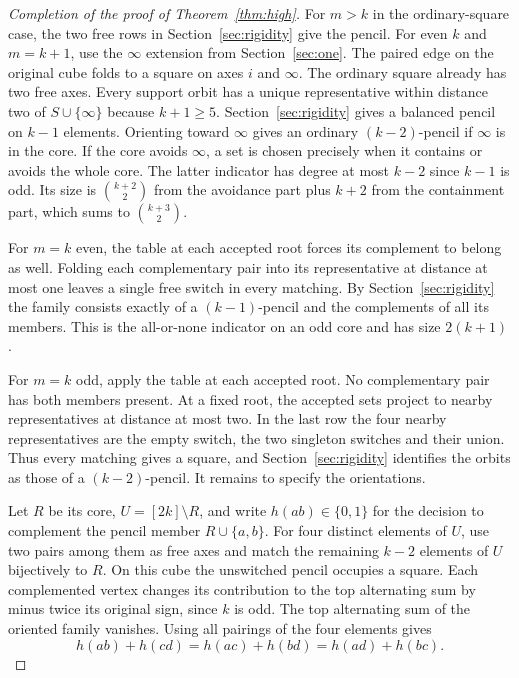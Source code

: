 \documentclass[11pt,letterpaper]{article}
\numberwithin{equation}{section}
\begin{document}
\begin{proof}[Completion of the proof of Theorem~\ref{thm:high}]

For $m>k$ in the ordinary-square case, the two free rows in Section~\ref{sec:rigidity} give
the pencil. For even $k$ and $m=k+1$, use the $\infty$ extension from Section~\ref{sec:one}.
The paired edge on the original cube folds to a square on axes $i$ and $\infty$. The ordinary
square already has two free axes. Every support orbit has a unique representative within
distance two of $S\cup\{\infty\}$ because $k+1\ge5$. Section~\ref{sec:rigidity} gives a
balanced pencil on $k-1$ elements. Orienting toward $\infty$ gives an ordinary $(k-2)$-pencil
if $\infty$ is in the core. If the core avoids $\infty$, a set is chosen precisely when it
contains or avoids the whole core. The latter indicator has degree at most $k-2$ since $k-1$
is odd. Its size is $\binom{k+2}{2}$ from the avoidance part plus $k+2$ from the containment
part, which sums to $\binom{k+3}{2}$.

For $m=k$ even, the table at each accepted root forces its complement to belong as well.
Folding each complementary pair into its representative at distance at most one leaves a
single free switch in every matching. By Section~\ref{sec:rigidity} the family consists
exactly of a $(k-1)$-pencil and the complements of all its members. This is the all-or-none
indicator on an odd core and has size $2(k+1)$.

For $m=k$ odd, apply the table at each accepted root. No complementary pair has both members
present. At a fixed root, the accepted sets project to nearby representatives at distance at
most two. In the last row the four nearby representatives are the empty switch, the two
singleton switches and their union. Thus every matching gives a square, and
Section~\ref{sec:rigidity} identifies the orbits as those of a $(k-2)$-pencil. It remains to
specify the orientations.

Let $R$ be its core, $U=[2k]\setminus R$, and write $h(ab)\in\{0,1\}$ for the decision to
complement the pencil member $R\cup\{a,b\}$. For four distinct elements of $U$, use two pairs
among them as free axes and match the remaining $k-2$ elements of $U$ bijectively to $R$. On
this cube the unswitched pencil occupies a square. Each complemented vertex changes its
contribution to the top alternating sum by minus twice its original sign, since $k$ is odd.
The top alternating sum of the oriented family vanishes. Using all pairings of the four
elements gives
\[
h(ab)+h(cd)=h(ac)+h(bd)=h(ad)+h(bc).
\]


\end{proof}
\end{document}
